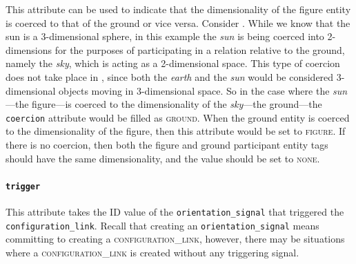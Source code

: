 \documentclass[11pt]{article}
\newcommand{\entity}[2]{[\textbf{\color{darkblue}#1}$_{se#2}$]}
\begin{document}
This attribute can be used to indicate that the dimensionality of the figure entity is coerced to that of the ground or vice versa. Consider . While we know that the sun is a 3-dimensional sphere, in this example the \emph{sun} is being coerced into 2-dimensions for the purposes of participating in a relation relative to the ground, namely the \emph{sky}, which is acting as a 2-dimensional space. This type of coercion does not take place in , since both the \emph{earth} and the \emph{sun} would be considered 3-dimensional objects moving in 3-dimensional space. So in the case where the \emph{sun}---the figure---is coerced to the dimensionality of the \emph{sky}---the ground---the \texttt{coercion} attribute would be filled as \textsc{ground}. When the ground entity is coerced to the dimensionality of the figure, then this attribute would be set to \textsc{figure}. If there is no coercion, then both the figure and ground participant entity tags should have the same dimensionality, and the value should be set to \textsc{none}. 

\label{ex:coercion}



\paragraph{\texttt{trigger}} %
\label{par:trigger}
This attribute takes the ID value of the \texttt{orientation\_signal} that triggered the \texttt{configuration\_link}. Recall that creating an \texttt{orientation\_signal} means committing to creating a \textsc{configuration\_link}, however, there may be situations where a \textsc{configuration\_link} is created without any triggering signal.


\end{document}
